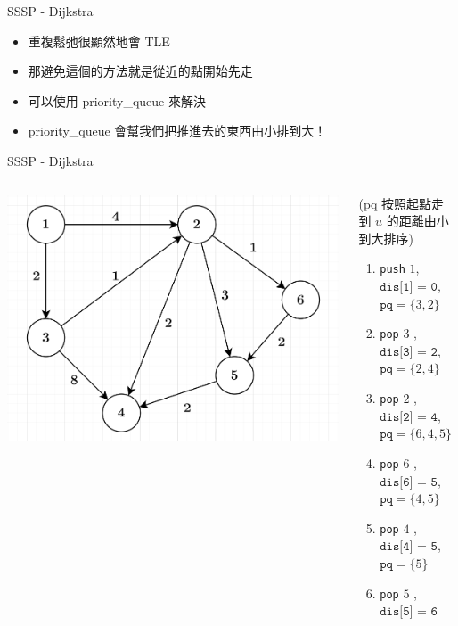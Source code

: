 \documentclass[aspectratio=169]{beamer}
\begin{document}
    \begin{frame}{SSSP - Dijkstra}
        \begin{itemize}
            \item 重複鬆弛很顯然地會 TLE
            \item 那避免這個的方法就是從近的點開始先走
            \item 可以使用 priority\_queue 來解決
            \item priority\_queue 會幫我們把推進去的東西由小排到大！
        \end{itemize}
    \end{frame}
    
    \begin{frame}{SSSP - Dijkstra}
        \begin{columns}
            \begin{column}{0.5\textwidth}
                \begin{center}
                    \includegraphics[scale=0.3]{images/dijkstra.png}
                \end{center}
            \end{column}
            \begin{column}{0.5\textwidth}
                (pq 按照起點走到 $u$ 的距離由小到大排序) 
                \begin{enumerate}
                    \item \texttt{push} $1$, $\texttt{dis[1] = 0}$, $\mathtt{pq} = \{3,2\}$
                    \item \texttt{pop} $3$ , $\texttt{dis[3] = 2}$, $\mathtt{pq} = \{2,4\}$
                    \item \texttt{pop} $2$ , $\texttt{dis[2] = 4}$, $\mathtt{pq} = \{6,4,5\}$
                    \item \texttt{pop} $6$ , $\texttt{dis[6] = 5}$, $\mathtt{pq} = \{4,5\}$
                    \item \texttt{pop} $4$ , $\texttt{dis[4] = 5}$, $\mathtt{pq} = \{5\}$
                    \item \texttt{pop} $5$ , $\texttt{dis[5] = 6}$
                \end{enumerate}
            \end{column}
        \end{columns}
    \end{frame}
    
\end{document}

